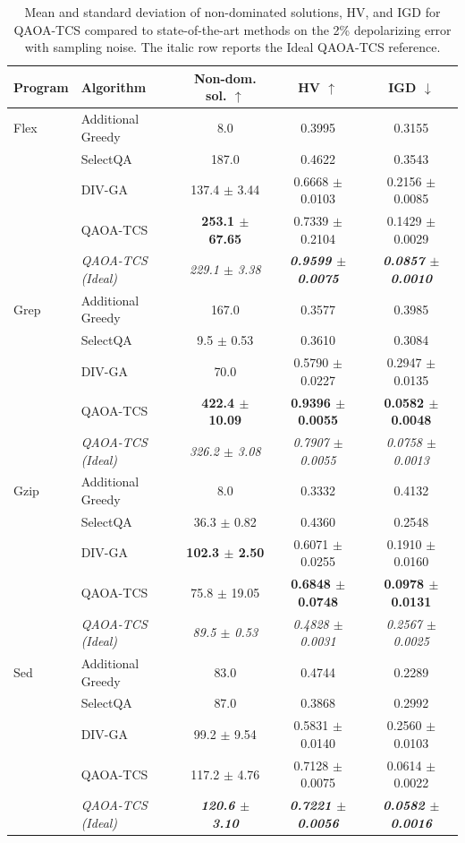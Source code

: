 \begin{table}[ht]
\centering
\scriptsize
\setlength{\tabcolsep}{3pt}
\caption{Mean and standard deviation of non-dominated solutions, HV, and IGD for QAOA-TCS compared to state-of-the-art methods on the 2\% depolarizing error with sampling noise. The italic row reports the Ideal QAOA-TCS reference.}
\label{tab:noise2_means}
\begin{tabular}{llccc}
\toprule
\textbf{Program} & \textbf{Algorithm} & \textbf{Non-dom. sol.} $\uparrow$ & \textbf{HV} $\uparrow$ & \textbf{IGD} $\downarrow$ \\
\midrule
Flex & Additional Greedy & 8.0 & 0.3995 & 0.3155 \\
 & SelectQA & 187.0 & 0.4622 & 0.3543 \\
 & DIV-GA & 137.4 $\pm$ 3.44 & 0.6668 $\pm$ 0.0103 & 0.2156 $\pm$ 0.0085 \\
 & QAOA-TCS & \textbf{253.1 $\pm$ 67.65} & 0.7339 $\pm$ 0.2104 & 0.1429 $\pm$ 0.0029 \\
 & \textit{QAOA-TCS (Ideal)} & \textit{229.1 $\pm$ 3.38} & \textbf{\textit{0.9599 $\pm$ 0.0075}} & \textbf{\textit{0.0857 $\pm$ 0.0010}} \\
\midrule
Grep & Additional Greedy & 167.0 & 0.3577 & 0.3985 \\
 & SelectQA & 9.5 $\pm$ 0.53 & 0.3610 & 0.3084 \\
 & DIV-GA & 70.0 & 0.5790 $\pm$ 0.0227 & 0.2947 $\pm$ 0.0135 \\
 & QAOA-TCS & \textbf{422.4 $\pm$ 10.09} & \textbf{0.9396 $\pm$ 0.0055} & \textbf{0.0582 $\pm$ 0.0048} \\
 & \textit{QAOA-TCS (Ideal)} & \textit{326.2 $\pm$ 3.08} & \textit{0.7907 $\pm$ 0.0055} & \textit{0.0758 $\pm$ 0.0013} \\
\midrule
Gzip & Additional Greedy & 8.0 & 0.3332 & 0.4132 \\
 & SelectQA & 36.3 $\pm$ 0.82 & 0.4360 & 0.2548 \\
 & DIV-GA & \textbf{102.3 $\pm$ 2.50} & 0.6071 $\pm$ 0.0255 & 0.1910 $\pm$ 0.0160 \\
 & QAOA-TCS & 75.8 $\pm$ 19.05 & \textbf{0.6848 $\pm$ 0.0748} & \textbf{0.0978 $\pm$ 0.0131} \\
 & \textit{QAOA-TCS (Ideal)} & \textit{89.5 $\pm$ 0.53} & \textit{0.4828 $\pm$ 0.0031} & \textit{0.2567 $\pm$ 0.0025} \\
\midrule
Sed & Additional Greedy & 83.0 & 0.4744 & 0.2289 \\
 & SelectQA & 87.0 & 0.3868 & 0.2992 \\
 & DIV-GA & 99.2 $\pm$ 9.54 & 0.5831 $\pm$ 0.0140 & 0.2560 $\pm$ 0.0103 \\
 & QAOA-TCS & 117.2 $\pm$ 4.76 & 0.7128 $\pm$ 0.0075 & 0.0614 $\pm$ 0.0022 \\
 & \textit{QAOA-TCS (Ideal)} & \textbf{\textit{120.6 $\pm$ 3.10}} & \textbf{\textit{0.7221 $\pm$ 0.0056}} &\textbf{ \textit{0.0582 $\pm$ 0.0016}} \\
\bottomrule
\end{tabular}%
\end{table}

